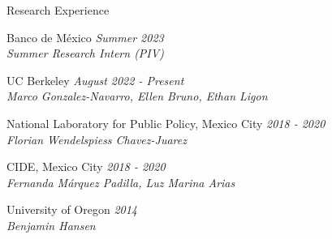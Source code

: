 \documentclass{resume} %
\begin{document}
\begin{rSection}{Research Experience}
\item Banco de México \hfill {\em Summer 2023} \\
\textit{Summer Research Intern (PIV)} \hfill

\item UC Berkeley \hfill {\em August 2022 - Present} \\
\textit{Marco Gonzalez-Navarro, Ellen Bruno, Ethan Ligon} \hfill

\item National Laboratory for Public Policy, Mexico City \hfill {\em 2018 - 2020}  \\
\textit{Florian Wendelspiess Chavez-Juarez} \hfill 
\item CIDE, Mexico City \hfill {\em 2018 - 2020} \\
\textit{Fernanda Márquez Padilla, Luz Marina Arias} \hfill
\item University of Oregon \hfill {\em 2014} \\
\textit{Benjamin Hansen} \hfill
\end{rSection}
\end{document}
